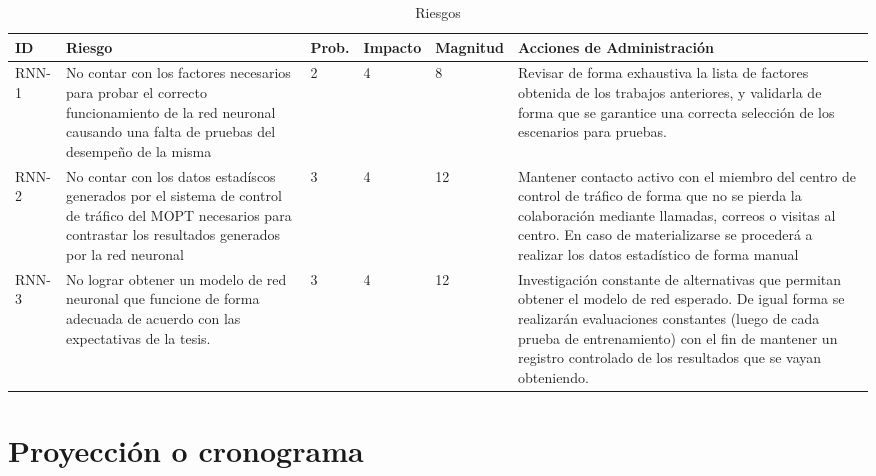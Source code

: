 	\begin{table}[!h]
			\centering
			\begin{tabular}{|p{1.3cm}|p{3cm}|p{1cm}|p{1.6cm}|p{1.8cm}|p{6cm}|}
				\hline
				\textbf{ID} & \textbf{Riesgo} & \textbf{Prob.} & \textbf{Impacto} & \textbf{Magnitud} & \textbf{Acciones de
				Administraci\'{o}n}\\ \hline 
				RNN-1 & No contar con los factores necesarios para probar el correcto
				funcionamiento de la red neuronal causando una falta de pruebas del
				desempe\~{n}o de la misma & 2 & 4 & 8 & Revisar de forma exhaustiva la lista
				de factores obtenida de los trabajos anteriores, y validarla de forma que se
				garantice una correcta selecci\'{o}n de los escenarios para pruebas.
				\\
				\hline
				RNN-2 & No contar con los datos estad\'{i}scos generados por el sistema de
				control de tr\'{a}fico del MOPT necesarios para contrastar los resultados
				generados por la red neuronal & 3 & 4 & 12 & Mantener contacto activo con
				el miembro del centro de control de tr\'{a}fico de forma que no se pierda
				la colaboraci\'{o}n mediante llamadas, correos o visitas al centro. En caso
				de materializarse se proceder\'{a} a realizar los datos estad\'{i}stico de
				forma manual\\ 
				\hline 
				RNN-3 & No lograr obtener un modelo de red neuronal que funcione de forma
				adecuada de acuerdo con las expectativas de la tesis. & 3 & 4 & 12 &
				Investigaci\'{o}n constante de alternativas que permitan obtener el
				modelo de red esperado. De igual forma se realizar\'{a}n evaluaciones
				constantes (luego de cada prueba de entrenamiento) con el fin de mantener un
				registro controlado de los resultados que se vayan obteniendo. 
				\\ 
				\hline 							
				 
			\end{tabular}
			\caption{Riesgos}
			\label{tab:risk}
		\end{table}
		
	\section{Proyecci\'{o}n o cronograma}	